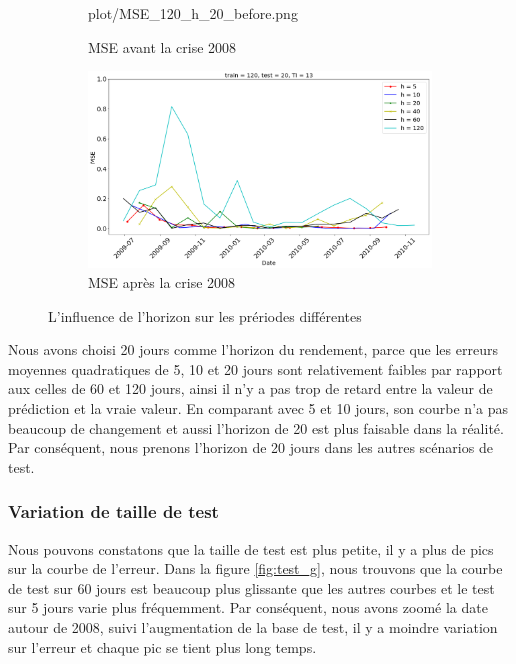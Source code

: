 \begin{figure}[H]
\begin{subfigure}{.5\textwidth}
	{plot/MSE_120_h_20_before.png}
	\caption{MSE avant la crise 2008}
	\label{fig:Horizon_before}
	\end{subfigure}%
	\begin{subfigure}{.5\textwidth}
	\centering
	\includegraphics[width=.9\linewidth, scale=0.2]
	{plot/MSE_120_h_20_after.png}
	\caption{MSE après la crise 2008}
	\label{fig:Horizon_after}
	\end{subfigure}
\caption{L'influence de l'horizon sur les prériodes différentes}
\label{fig:MSE_horizon}
\end{figure}

Nous avons choisi 20 jours comme l'horizon du rendement, parce que les erreurs moyennes quadratiques de 5, 10 et 20 jours sont relativement faibles par rapport aux celles de 60 et 120 jours, ainsi il n'y a pas trop de retard entre la valeur de prédiction et la vraie valeur. En comparant avec 5 et 10 jours, son courbe n'a pas beaucoup de changement et aussi l'horizon de 20 est plus faisable dans la réalité. Par conséquent, nous prenons l'horizon de 20 jours dans les autres scénarios de test.

\subsubsection{Variation de taille de test}


Nous pouvons constatons que la taille de test est plus petite, il y a plus de pics sur la courbe de l'erreur. Dans la figure \ref{fig:test_g}, nous trouvons que la courbe de test sur 60 jours est beaucoup plus glissante que les autres courbes et le test sur 5 jours varie plus fréquemment. Par conséquent, nous avons zoomé la date autour de 2008, suivi l'augmentation de la base de test, il y a moindre variation sur l'erreur et chaque pic se tient plus long temps.  


